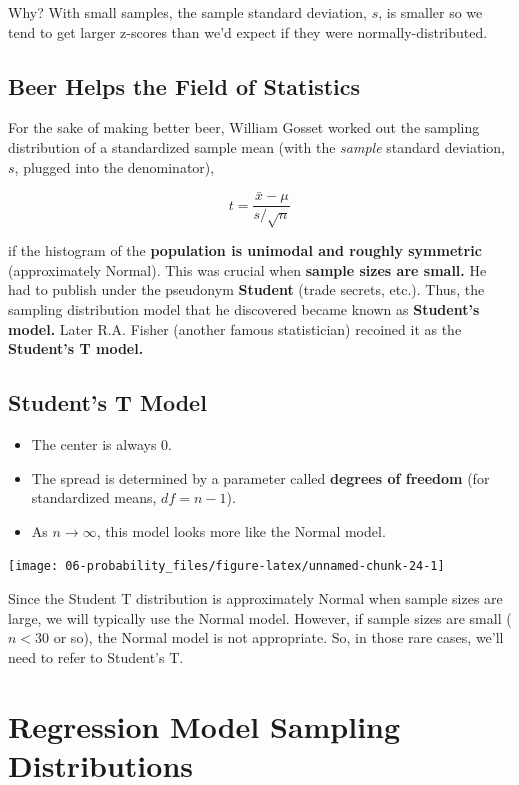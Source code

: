\documentclass[
]{book}
\providecommand{\tightlist}{%
  \setlength{\itemsep}{0pt}\setlength{\parskip}{0pt}}
\begin{document}
Why? With small samples, the sample standard deviation, \(s\), is smaller so we tend to get larger z-scores than we'd expect if they were normally-distributed.

\subsection{Beer Helps the Field of Statistics}\label{beer-helps-the-field-of-statistics}

For the sake of making better beer, William Gosset worked out the sampling distribution of a standardized sample mean (with the \emph{sample} standard deviation, \(s\), plugged into the denominator),

\[t = \frac{\bar{x} - \mu}{s/\sqrt{n}}\]

if the histogram of the \textbf{population is unimodal and roughly symmetric} (approximately Normal). This was crucial when \textbf{sample sizes are small.} He had to publish under the pseudonym \textbf{Student} (trade secrets, etc.). Thus, the sampling distribution model that he discovered became known as \textbf{Student's model.} Later R.A. Fisher (another famous statistician) recoined it as the \textbf{Student's T model.}

\subsection{Student's T Model}\label{students-t-model}

\begin{itemize}
\tightlist
\item
  The center is always 0.
\item
  The spread is determined by a parameter called \textbf{degrees of freedom} (for standardized means, \(df = n - 1\)).
\item
  As \(n\rightarrow\infty\), this model looks more like the Normal model.
\end{itemize}

\begin{center}\texttt{[image: 06-probability\_files/figure-latex/unnamed-chunk-24-1]} \end{center}

Since the Student T distribution is approximately Normal when sample sizes are large, we will typically use the Normal model. However, if sample sizes are small (\(n<30\) or so), the Normal model is not appropriate. So, in those rare cases, we'll need to refer to Student's T.

\section{Regression Model Sampling Distributions}\label{regression-model-sampling-distributions}
\end{document}
